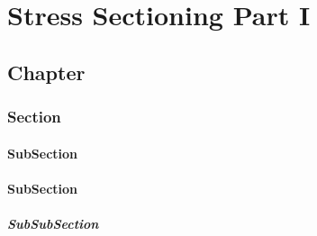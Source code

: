 %

%
%
%
%

\part{Stress Sectioning Part I}

\chapter{Chapter}

\section{Section}

\begin{footnotesize}

\end{footnotesize}

\subsection{SubSection}

\subsection{SubSection}

\subsubsection{SubSubSection}
